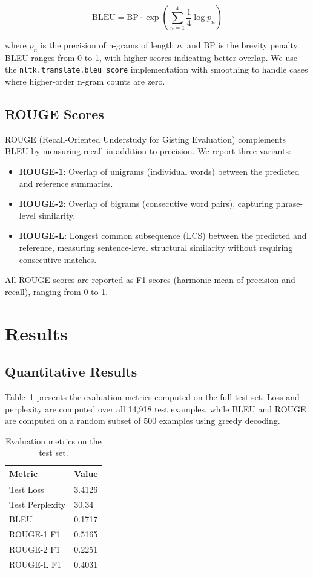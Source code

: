 \documentclass[11pt]{article}
\begin{document}
\[
\text{BLEU} = \text{BP} \cdot \exp\!\left(\sum_{n=1}^{4} \frac{1}{4} \log p_n\right)
\]

where $p_n$ is the precision of n-grams of length $n$, and BP is the brevity penalty. BLEU ranges from 0 to 1, with higher scores indicating better overlap. We use the \texttt{nltk.translate.bleu\_score} implementation with smoothing to handle cases where higher-order n-gram counts are zero.

\subsection{ROUGE Scores}

ROUGE (Recall-Oriented Understudy for Gisting Evaluation) \cite{lin2004rouge} complements BLEU by measuring recall in addition to precision. We report three variants:

\begin{itemize}
\item \textbf{ROUGE-1}: Overlap of unigrams (individual words) between the predicted and reference summaries.
\item \textbf{ROUGE-2}: Overlap of bigrams (consecutive word pairs), capturing phrase-level similarity.
\item \textbf{ROUGE-L}: Longest common subsequence (LCS) between the predicted and reference, measuring sentence-level structural similarity without requiring consecutive matches.
\end{itemize}

All ROUGE scores are reported as F1 scores (harmonic mean of precision and recall), ranging from 0 to 1.

\section{Results}

\subsection{Quantitative Results}

Table~\ref{tab:test_results} presents the evaluation metrics computed on the full test set. Loss and perplexity are computed over all 14,918 test examples, while BLEU and ROUGE are computed on a random subset of 500 examples using greedy decoding.

\begin{table}[h]
\centering
\begin{tabular}{@{}ll@{}}
\toprule
\textbf{Metric} & \textbf{Value} \\
\midrule
Test Loss & 3.4126 \\
Test Perplexity & 30.34 \\
BLEU & 0.1717 \\
ROUGE-1 F1 & 0.5165 \\
ROUGE-2 F1 & 0.2251 \\
ROUGE-L F1 & 0.4031 \\
\bottomrule
\end{tabular}
\caption{Evaluation metrics on the test set.}
\label{tab:test_results}
\end{table}
\end{document}
